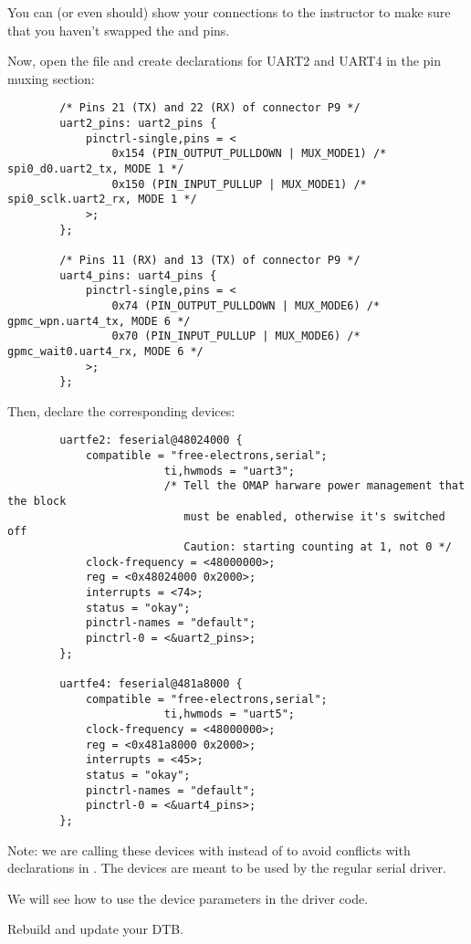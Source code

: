 You can (or even should) show your connections to the instructor
to make sure that you haven't swapped the  and  pins. 

Now, open the 
file and create declarations for UART2 and UART4 in the pin muxing
section:

\begin{verbatim}
		/* Pins 21 (TX) and 22 (RX) of connector P9 */
		uart2_pins: uart2_pins {
			pinctrl-single,pins = <
				0x154 (PIN_OUTPUT_PULLDOWN | MUX_MODE1) /* spi0_d0.uart2_tx, MODE 1 */
				0x150 (PIN_INPUT_PULLUP | MUX_MODE1) /* spi0_sclk.uart2_rx, MODE 1 */
			>;
		};

		/* Pins 11 (RX) and 13 (TX) of connector P9 */
		uart4_pins: uart4_pins {
			pinctrl-single,pins = <
				0x74 (PIN_OUTPUT_PULLDOWN | MUX_MODE6) /* gpmc_wpn.uart4_tx, MODE 6 */
				0x70 (PIN_INPUT_PULLUP | MUX_MODE6) /* gpmc_wait0.uart4_rx, MODE 6 */
			>;
		};
\end{verbatim}

Then, declare the corresponding devices:

\begin{verbatim}
		uartfe2: feserial@48024000 {
			compatible = "free-electrons,serial";
                        ti,hwmods = "uart3";
                        /* Tell the OMAP harware power management that the block
                           must be enabled, otherwise it's switched off
                           Caution: starting counting at 1, not 0 */
			clock-frequency = <48000000>;
			reg = <0x48024000 0x2000>;
			interrupts = <74>;
			status = "okay";
			pinctrl-names = "default";
			pinctrl-0 = <&uart2_pins>;
		};

		uartfe4: feserial@481a8000 {
			compatible = "free-electrons,serial";
                        ti,hwmods = "uart5";
			clock-frequency = <48000000>;
			reg = <0x481a8000 0x2000>;
			interrupts = <45>;
			status = "okay";
			pinctrl-names = "default";
			pinctrl-0 = <&uart4_pins>;
		};

\end{verbatim}

Note: we are calling these devices with  instead of
 to avoid conflicts with declarations in
. The  devices are 
meant to be used by the regular serial driver.

We will see how to use the device parameters in the driver code.

Rebuild and update your DTB.

